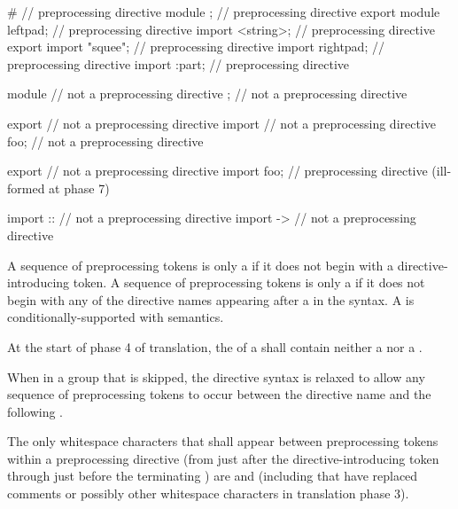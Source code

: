 \documentclass{wg21}
\begin{document}
\begin{example}
    \begin{codeblock}
        #                       // preprocessing directive
        module ;                // preprocessing directive
        export module leftpad;  // preprocessing directive
        import <string>;        // preprocessing directive
        export import "squee";  // preprocessing directive
        import rightpad;        // preprocessing directive
        import :part;           // preprocessing directive

        module                  // not a preprocessing directive
        ;                       // not a preprocessing directive

        export                  // not a preprocessing directive
        import                  // not a preprocessing directive
        foo;                    // not a preprocessing directive

        export                  // not a preprocessing directive
        import foo;             // preprocessing directive (ill-formed at phase 7)

        import ::               // not a preprocessing directive
        import ->               // not a preprocessing directive
    \end{codeblock}
\end{example}

\pnum
A sequence of preprocessing tokens is only a 
if it does not begin with a directive-introducing token.
A sequence of preprocessing tokens is only a 
if it does not begin with any of the directive names
appearing after a \tcode{\#} in the syntax.
A  is
conditionally-supported with
semantics.

\pnum
At the start of phase 4 of translation,
the  of a  shall
contain neither a  nor a .

\pnum
When in a group that is skipped, the directive
syntax is relaxed to allow any sequence of preprocessing tokens to occur between
the directive name and the following .

\pnum
The only whitespace characters that shall appear
between preprocessing tokens
within a preprocessing directive
(from just after the directive-introducing token
through just before the terminating )
are  and 
(including  that have replaced comments
or possibly other whitespace characters
in translation phase 3).
\end{document}
